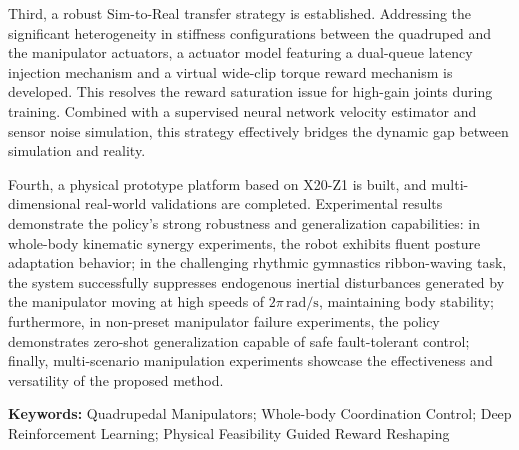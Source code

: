 Third, a robust Sim-to-Real transfer strategy is established. Addressing the significant heterogeneity in stiffness configurations between the quadruped and the manipulator actuators, a actuator model featuring a dual-queue latency injection mechanism and a virtual wide-clip torque reward mechanism is developed. This resolves the reward saturation issue for high-gain joints during training. Combined with a supervised neural network velocity estimator and sensor noise simulation, this strategy effectively bridges the dynamic gap between simulation and reality.

Fourth, a physical prototype platform based on X20-Z1 is built, and multi-dimensional real-world validations are completed. Experimental results demonstrate the policy's strong robustness and generalization capabilities: in whole-body kinematic synergy experiments, the robot exhibits fluent posture adaptation behavior; in the challenging rhythmic gymnastics ribbon-waving task, the system successfully suppresses endogenous inertial disturbances generated by the manipulator moving at high speeds of $2\pi\,\text{rad/s}$, maintaining body stability; furthermore, in non-preset manipulator failure experiments, the policy demonstrates zero-shot generalization capable of safe fault-tolerant control; finally, multi-scenario manipulation experiments showcase the effectiveness and versatility of the proposed method.

\vspace{1em}
\noindent \textbf{Keywords:} Quadrupedal Manipulators; Whole-body Coordination Control; Deep Reinforcement Learning; Physical Feasibility Guided Reward Reshaping
